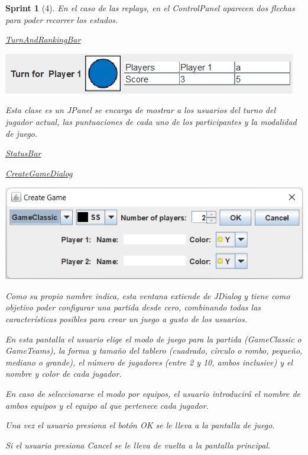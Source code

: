 \documentclass{article}
\theoremstyle{break}
\newtheorem*{sprint}{Sprint}
\begin{document}
\begin{sprint}[4]
En el caso de las \textit{replays}, en el \textit{ControlPanel} aparecen dos flechas para poder recorrer los estados.

\underline{TurnAndRankingBar}
\begin{center}
\includegraphics[scale=1]{turn-ranking-panel-sprint3.png}
\end{center}

Esta clase es un \textit{JPanel} se encarga de mostrar a los usuarios del turno del jugador actual, las puntuaciones de cada uno de los participantes y la modalidad de juego.

\underline{StatusBar}


\underline{CreateGameDialog}
\begin{center}
\includegraphics[scale=0.8]{create-game-sprint3.png}
\end{center}

Como su propio nombre indica, esta ventana extiende de \textit{JDialog} y tiene como objetivo poder configurar una partida desde cero, combinando todas las características posibles para crear un juego a gusto de los usuarios.

En esta pantalla el usuario elige el modo de juego para la partida (\textit{GameClassic} o \textit{GameTeams}), la forma y tamaño del tablero (cuadrado, círculo o rombo, pequeño, mediano o grande), el número de jugadores (entre 2 y 10, ambos inclusive) y el nombre y color de cada jugador.

En caso de seleccionarse el modo por equipos, el usuario introducirá el nombre de ambos equipos y el equipo al que pertenece cada jugador.

Una vez el usuario presiona el botón \textit{OK} se le lleva a la pantalla de juego.

Si el usuario presiona \textit{Cancel} se le lleva de vuelta a la pantalla principal.


\end{sprint}
\end{document}
